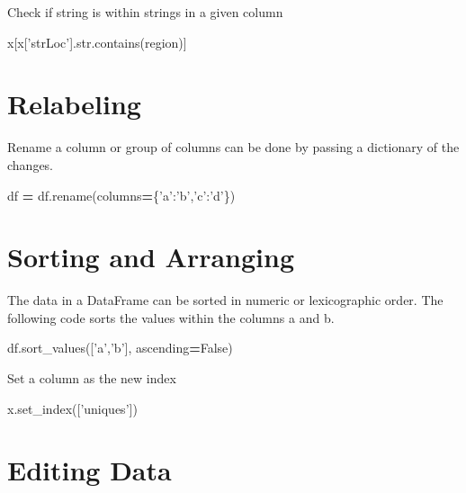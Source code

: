 \documentclass[]{book}
\newenvironment{Shaded}{\begin{snugshade}}{\end{snugshade}}
\newcommand{\StringTok}[1]{\textcolor[rgb]{0.31,0.60,0.02}{#1}}
\newcommand{\VariableTok}[1]{\textcolor[rgb]{0.00,0.00,0.00}{#1}}
\newcommand{\OperatorTok}[1]{\textcolor[rgb]{0.81,0.36,0.00}{\textbf{#1}}}
\newcommand{\BuiltInTok}[1]{#1}
\newcommand{\NormalTok}[1]{#1}
\begin{document}
Check if string is within strings in a given column

\begin{Shaded}
\begin{Highlighting}[]
\NormalTok{x[x[}\StringTok{'strLoc'}\NormalTok{].}\BuiltInTok{str}\NormalTok{.contains(region)]}
\end{Highlighting}
\end{Shaded}

\section{Relabeling}\label{relabeling}

Rename a column or group of columns can be done by passing a dictionary
of the changes.

\begin{Shaded}
\begin{Highlighting}[]
\NormalTok{    df }\OperatorTok{=}\NormalTok{ df.rename(columns}\OperatorTok{=}\NormalTok{\{}\StringTok{'a'}\NormalTok{:}\StringTok{'b'}\NormalTok{,}\StringTok{'c'}\NormalTok{:}\StringTok{'d'}\NormalTok{\})}
\end{Highlighting}
\end{Shaded}

\section{Sorting and Arranging}\label{sorting-and-arranging}

The data in a DataFrame can be sorted in numeric or lexicographic order.
The following code sorts the values within the columns a and b.

\begin{Shaded}
\begin{Highlighting}[]
\NormalTok{df.sort_values([}\StringTok{'a'}\NormalTok{,}\StringTok{'b'}\NormalTok{], ascending}\OperatorTok{=}\VariableTok{False}\NormalTok{)}
\end{Highlighting}
\end{Shaded}

Set a column as the new index

\begin{Shaded}
\begin{Highlighting}[]
\NormalTok{x.set_index([}\StringTok{'uniques'}\NormalTok{])}
\end{Highlighting}
\end{Shaded}

\section{Editing Data}\label{editing-data}
\end{document}
